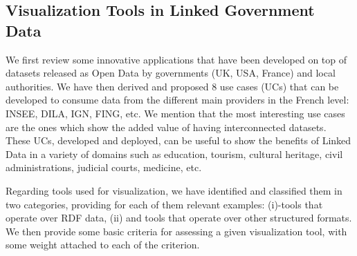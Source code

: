 \subsection{Visualization Tools in Linked Government Data} \label{visu}

We first review some innovative applications that have been developed on top of datasets released as Open Data by governments (UK, USA, France) and local authorities. We have then derived and proposed 8 use cases (UCs) that can be developed to consume data from the different main providers in the French level: INSEE, DILA, IGN, FING, etc. We mention that the most interesting use cases are the ones which show the added value of having interconnected datasets. These UCs,  developed and deployed, can be useful to show the benefits of Linked Data in a variety of domains such as education, tourism, cultural heritage, civil administrations, judicial courts, medicine, etc. 

Regarding tools used for visualization, we have identified and classified them in two categories, providing for each of them relevant examples: (i)-tools that operate over RDF data, (ii) and tools that operate over other structured formats. We then provide some basic criteria for assessing a given visualization tool, with some weight attached to each of the criterion. 

